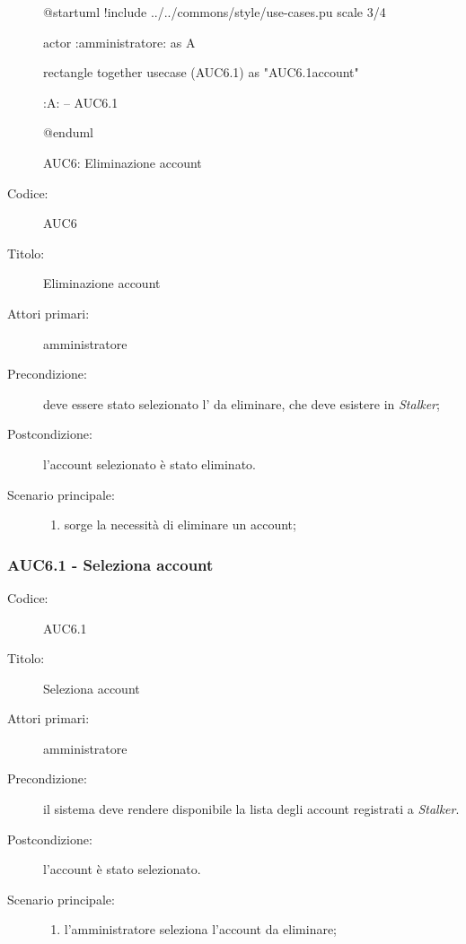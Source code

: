 \documentclass[../../../analisi-dei-requisiti.tex]{subfiles}
\begin{document}
\begin{figure}[h!]
  \centering
  \begin{plantuml}
  @startuml
  !include ../../commons/style/use-cases.pu
  scale 3/4

  actor :amministratore: as A

  rectangle {
    together {
      usecase (AUC6.1) as "AUC6.1\nSeleziona account"
    }
  }

  :A: -- AUC6.1

  @enduml
  \end{plantuml}
  \caption{AUC6: Eliminazione account}
  \label{fig:auc6}
\end{figure}

\begin{description}
  \item[Codice:] AUC6
  \item[Titolo:] Eliminazione account
  \item[Attori primari:] amministratore
  \item[Precondizione:] deve essere stato selezionato l' da eliminare, che deve esistere in \emph{Stalker};
  \item[Postcondizione:] l'account selezionato è stato eliminato.
  \item[Scenario principale:]
  \begin{enumerate}
    \item sorge la necessità di eliminare un account;
  \end{enumerate}
\end{description}

\subsubsection{AUC6.1 - Seleziona account}%
\label{subsub:AUC6.1}
\begin{description}
  \item[Codice:] AUC6.1
  \item[Titolo:] Seleziona account
  \item[Attori primari:] amministratore
  \item[Precondizione:] il sistema deve rendere disponibile la lista degli account registrati a \emph{Stalker}.
  \item[Postcondizione:] l'account è stato selezionato.
  \item[Scenario principale:]
  \begin{enumerate}
    \item l'amministratore seleziona l'account da eliminare;
  \end{enumerate}
\end{description}
\end{document}
